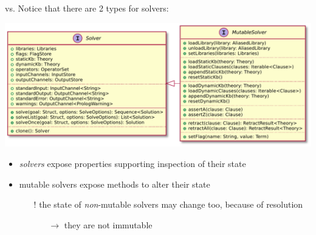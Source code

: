 \documentclass[handout]{beamer}
\begin{document}
\begin{frame}[allowframebreaks]{ vs. }
    Notice that there are 2 types for solvers:
    \begin{center}
        \includegraphics[width=.8\linewidth]{img/solve-mutable.pdf}
    \end{center}
    \begin{itemize}\small
        \item \emph{solvers} expose properties supporting \alert{inspection} of their state
        \item \alert{mutable} solvers expose methods to \alert{alter} their state
        \begin{itemize}
            \item[!] the state of \emph{non}-mutable solvers may change too, because of resolution
            \begin{itemize}
                \item[$\rightarrow$] they are \alert{not} immutable
            \end{itemize}
        \end{itemize}
    \end{itemize}

    \framebreak

\end{frame}
\end{document}

